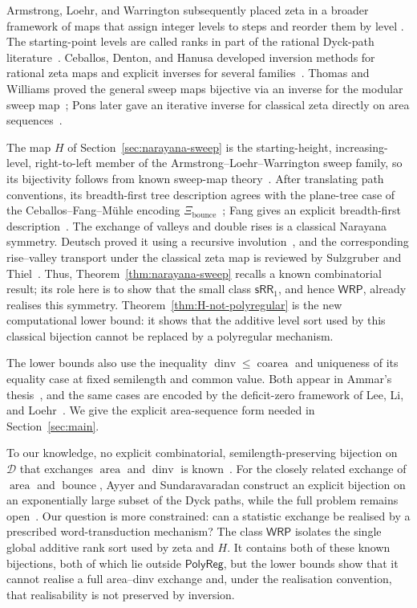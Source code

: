 \documentclass[11pt]{article}
\theoremstyle{definition}
\newcommand{\D}{\mathcal D}
\newcommand{\WRP}{\mathsf{WRP}}
\newcommand{\SWR}{\mathsf{sRR}_1}
\newcommand{\area}{\operatorname{area}}
\newcommand{\dinv}{\operatorname{dinv}}
\newcommand{\bounce}{\operatorname{bounce}}
\newcommand{\coarea}{\operatorname{coarea}}
\newcommand{\polyreg}{\mathsf{PolyReg}}
\begin{document}
Armstrong, Loehr, and Warrington subsequently placed zeta in a broader
framework of maps that assign integer levels to steps and reorder them by level
\cite{ArmstrongLoehrWarrington2015,ArmstrongLoehrWarrington2016}.  The
starting-point levels are called ranks in part of the rational Dyck-path
literature~\cite{Xin2015}.  Ceballos, Denton, and Hanusa developed inversion
methods for rational zeta maps and explicit inverses for several
families~\cite{CeballosDentonHanusa2016}.  Thomas and Williams proved the
general sweep maps bijective via an inverse for the modular sweep
map~\cite{ThomasWilliams2018}; Pons later gave an iterative inverse for
classical zeta directly on area sequences~\cite{Pons2022}.

The map $H$ of Section~\ref{sec:narayana-sweep} is the starting-height,
increasing-level, right-to-left member of the Armstrong--Loehr--Warrington
sweep family, so its bijectivity follows from known sweep-map
theory~\cite{ThomasWilliams2018}.  After
translating path conventions, its breadth-first tree description agrees with
the plane-tree case of the Ceballos--Fang--M\"uhle encoding
$\Xi_{\mathrm{bounce}}$~\cite[Section~3.3]{CeballosFangMuhle2020}; Fang gives an
explicit breadth-first description~\cite[Construction~3.6 and
Proposition~3.7]{Fang2024}.  The exchange of valleys and double
rises is a classical Narayana symmetry.  Deutsch proved it using a recursive
involution~\cite{Deutsch1999}, and the corresponding rise--valley transport
under the classical zeta map is reviewed by Sulzgruber and
Thiel~\cite[Section~2.8]{SulzgruberThiel2018}.  Thus,
Theorem~\ref{thm:narayana-sweep} recalls a known combinatorial result; its role
here is to show that the small class $\SWR$, and hence $\WRP$, already realises
this symmetry.  Theorem~\ref{thm:H-not-polyregular} is the new computational
lower bound: it shows that the additive level sort used by this classical
bijection cannot be replaced by a polyregular mechanism.

The lower bounds also use the inequality $\dinv\le\coarea$ and uniqueness of
its equality case at fixed semilength and common value.  Both appear in
Ammar's thesis~\cite{Ammar2015}, and the same cases are encoded by the
deficit-zero framework of Lee, Li, and Loehr~\cite{LeeLiLoehr2018}.  We give
the explicit area-sequence form needed in Section~\ref{sec:main}.

To our knowledge, no explicit combinatorial, semilength-preserving bijection on
$\D$ that exchanges $\area$ and $\dinv$ is known~\cite{Pons2022}.  For the
closely related exchange of $\area$ and $\bounce$, Ayyer and Sundaravaradan construct an
explicit bijection on an exponentially large subset of the Dyck paths, while
the full problem remains open~\cite{AyyerSundaravaradan2025}.  Our question is
more constrained: can a statistic exchange be realised by a prescribed
word-transduction mechanism?  The class $\WRP$ isolates the single global
additive rank sort used by zeta and $H$.  It contains both of these known
bijections, both of which lie outside $\polyreg$, but the lower bounds show
that it cannot realise a full area--dinv exchange and, under the realisation
convention, that realisability is not preserved by inversion.
\end{document}
